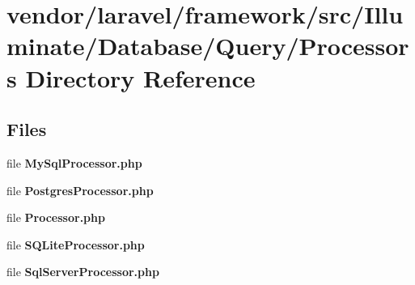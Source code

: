 \section{vendor/laravel/framework/src/\+Illuminate/\+Database/\+Query/\+Processors Directory Reference}
\label{dir_36a8cb8131e7e393c6447815f33db6fe}
\subsection*{Files}
\begin{DoxyCompactItemize}
\item 
file {\bf My\+Sql\+Processor.\+php}
\item 
file {\bf Postgres\+Processor.\+php}
\item 
file {\bf Processor.\+php}
\item 
file {\bf S\+Q\+Lite\+Processor.\+php}
\item 
file {\bf Sql\+Server\+Processor.\+php}
\end{DoxyCompactItemize}
